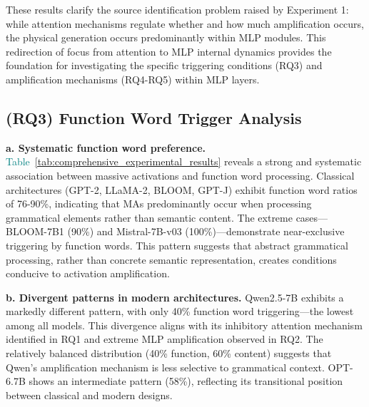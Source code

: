 \documentclass[conference]{IEEEtran}
\begin{document}
These results clarify the source identification problem raised by Experiment 1: while attention mechanisms regulate whether and how much amplification occurs, the physical generation occurs predominantly within MLP modules. This redirection of focus from attention to MLP internal dynamics provides the foundation for investigating the specific triggering conditions (RQ3) and amplification mechanisms (RQ4-RQ5) within MLP layers.

\vspace{0.5em}
\noindent{}
\vspace{0.5em}

\subsection{(RQ3) Function Word Trigger Analysis}
\label{sec:RQ3}


\smallskip
\noindent\textbf{a. Systematic function word preference.}
\textcolor{teal}{Table~\ref{tab:comprehensive_experimental_results}} reveals a strong and systematic association between massive activations and function word processing. Classical architectures (GPT-2, LLaMA-2, BLOOM, GPT-J) exhibit function word ratios of 76-90\%, indicating that MAs predominantly occur when processing grammatical elements rather than semantic content. The extreme cases—BLOOM-7B1 (90\%) and Mistral-7B-v03 (100\%)—demonstrate near-exclusive triggering by function words. This pattern suggests that abstract grammatical processing, rather than concrete semantic representation, creates conditions conducive to activation amplification.

\smallskip
\noindent\textbf{b. Divergent patterns in modern architectures.}
Qwen2.5-7B exhibits a markedly different pattern, with only 40\% function word triggering—the lowest among all models. This divergence aligns with its inhibitory attention mechanism identified in RQ1 and extreme MLP amplification observed in RQ2. The relatively balanced distribution (40\% function, 60\% content) suggests that Qwen's amplification mechanism is less selective to grammatical context. OPT-6.7B shows an intermediate pattern (58\%), reflecting its transitional position between classical and modern designs.
\end{document}
